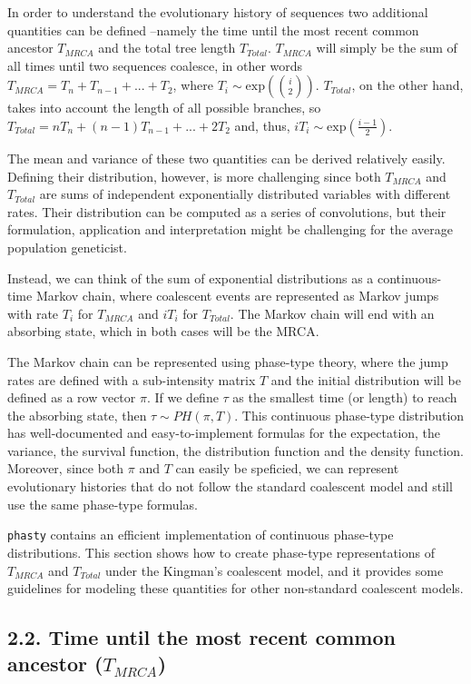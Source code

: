 \documentclass[]{article}
\begin{document}
In order to understand the evolutionary history of sequences two
additional quantities can be defined --namely the time until the most
recent common ancestor \(T_{MRCA}\) and the total tree length
\(T_{Total}\). \(T_{MRCA}\) will simply be the sum of all times until
two sequences coalesce, in other words \(T_{MRCA}=T_n+T_{n-1}+...+T_2\),
where \(T_i\sim\text{exp}(\binom{i}{2})\). \(T_{Total}\), on the other
hand, takes into account the length of all possible branches, so
\(T_{Total}=nT_n+(n-1)T_{n-1}+...+2T_2\) and, thus,
\(iT_i\sim \text{exp}(\frac{i-1}{2})\).

The mean and variance of these two quantities can be derived relatively
easily. Defining their distribution, however, is more challenging since
both \(T_{MRCA}\) and \(T_{Total}\) are sums of independent
exponentially distributed variables with different rates. Their
distribution can be computed as a series of convolutions, but their
formulation, application and interpretation might be challenging for the
average population geneticist.

Instead, we can think of the sum of exponential distributions as a
continuous-time Markov chain, where coalescent events are represented as
Markov jumps with rate \(T_i\) for \(T_{MRCA}\) and \(iT_i\) for
\(T_{Total}\). The Markov chain will end with an absorbing state, which
in both cases will be the MRCA.

The Markov chain can be represented using phase-type theory, where the
jump rates are defined with a sub-intensity matrix \(T\) and the initial
distribution will be defined as a row vector \(\pi\). If we define
\(\tau\) as the smallest time (or length) to reach the absorbing state,
then \(\tau\sim PH(\pi,T)\). This continuous phase-type distribution has
well-documented and easy-to-implement formulas for the expectation, the
variance, the survival function, the distribution function and the
density function. Moreover, since both \(\pi\) and \(T\) can easily be
speficied, we can represent evolutionary histories that do not follow
the standard coalescent model and still use the same phase-type
formulas.

\texttt{phasty} contains an efficient implementation of continuous
phase-type distributions. This section shows how to create phase-type
representations of \(T_{MRCA}\) and \(T_{Total}\) under the Kingman's
coalescent model, and it provides some guidelines for modeling these
quantities for other non-standard coalescent models.

\hypertarget{time-until-the-most-recent-common-ancestor-t_mrca}{%
\subsection{\texorpdfstring{2.2. Time until the most recent common
ancestor
(\(T_{MRCA}\))}{2.2. Time until the most recent common ancestor (T\_\{MRCA\})}}\label{time-until-the-most-recent-common-ancestor-t_mrca}}
\end{document}
